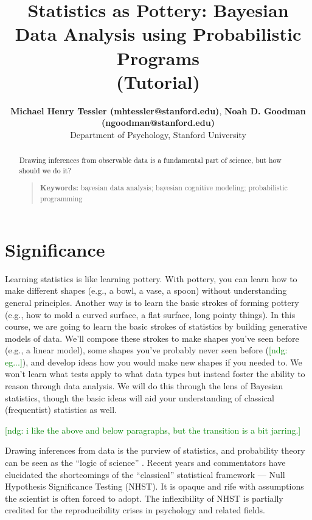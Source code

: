 \documentclass[10pt,letterpaper]{article}
\title{Statistics as Pottery: Bayesian Data Analysis using Probabilistic Programs \\(Tutorial)}
\author{{\large \bf Michael Henry Tessler (mhtessler@stanford.edu)}, {\large \bf Noah D. Goodman (ngoodman@stanford.edu)}  \\
  Department of Psychology, Stanford University
  }
\newcommand{\ndg}[1]{\textcolor{green}{[ndg: #1]}}
\begin{document}
\maketitle

\begin{abstract}

Drawing inferences from observable data is a fundamental part of science, but how should we do it?
\begin{quote}
\small
\textbf{Keywords:} 
bayesian data analysis; bayesian cognitive modeling; probabilistic programming
\end{quote}

\end{abstract}





\section{Significance}

Learning statistics is like learning pottery. 
With pottery, you can learn how to make different shapes (e.g., a bowl, a vase, a spoon) without understanding general principles. 
Another way is to learn the basic strokes of forming pottery (e.g., how to mold a curved surface, a flat surface, long pointy things). 
In this course, we are going to learn the basic strokes of statistics by building generative models of data. 
We'll compose these strokes to make shapes you've seen before (e.g., a linear model), some shapes you've probably never seen before (\ndg{eg...}), and develop ideas how you would make new shapes if you needed to. 
We won't learn what tests apply to what data types but instead foster the ability to reason through data analysis. 
We will do this through the lens of Bayesian statistics, though the basic ideas will aid your understanding of classical (frequentist) statistics as well.

\ndg{i like the above and below paragraphs, but the transition is a bit jarring.}

Drawing inferences from data is the purview of statistics, and probability theory can be seen as the ``logic of science'' \cite{jaynes2003probability}.
Recent years and commentators have elucidated the shortcomings of the ``classical'' statistical framework --- Null Hypothesis Significance Testing (NHST). 
It is opaque and rife with assumptions the scientist is often forced to adopt.
The inflexibility of NHST is partially credited for the reproducibility crises in psychology and related fields. 
\end{document}
